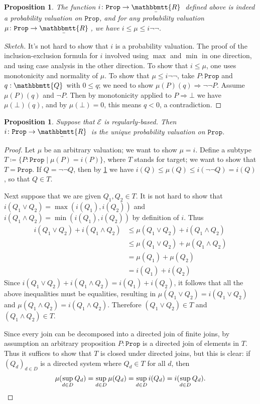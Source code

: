 \documentclass[11pt, oneside, article]{memoir}
\theoremstyle{plain}
\newtheorem{proposition}[theorem]{Proposition}
\theoremstyle{definition}
\theoremstyle{remark}
\newcommand{\const}[1]{\mathtt{#1}}
\newcommand{\cat}[1]{\mathcal{#1}}
\newcommand{\ubar}[1]{\underaccent{\bar}{#1}}
\newcommand{\internal}[1]{\raisebox{-.03ex}{$\mathbbmtt{#1}$}}
\newcommand{\hs}{\hspace{1.1pt}}
\newcommand{\tQQ}{\internal{Q}\hs}
\newcommand{\tRR}{\internal{R}\hs}
\newcommand{\tLR}{\ubar{\tRR}\hs}
\newcommand{\Prop}{\const{Prop}}
\newcommand{\imp}{\Rightarrow}
\begin{document}
\begin{proposition}\label{prop.sandwich}
The function $i\colon\Prop\to\tLR$ defined above is indeed a probability valuation on $\Prop$, and for any probability valuation $\mu\colon\Prop\to\tLR$, we have $i\leq\mu\leq i\neg\neg$.
\end{proposition}
\begin{proof}[Sketch]
It's not hard to show that $i$ is a probability valuation. The proof of the inclusion-exclusion formula for $i$ involved using $\max$ and $\min$ in one direction, and using case analysis in the other direction. To show that $i\leq\mu$, one uses monotonicity and normality of $\mu$. To show that $\mu\leq i\neg\neg$, take $P:\Prop$ and $q:\tQQ$ with $0\leq q$; we need to show $\mu(P)(q)\imp\neg\neg P$. Assume $\mu(P)(q)$ and $\neg P$. Then by monotonicity applied to $P \imp \bot$ we have $\mu(\bot)(q)$, and by $\mu(\bot)=0$, this means $q<0$, a contradiction.
\end{proof}

\begin{proposition}\label{prop.unique_probability_valuation_on_prop}
Suppose that $\cat{E}$ is regularly-based. Then $i\colon\Prop\to\tLR$ is the unique probability valuation on $\Prop$. 
\end{proposition}
\begin{proof}
Let $\mu$ be an arbitrary valuation; we want to show $\mu=i$. Define a subtype $T\coloneqq\{P:\Prop\mid\mu(P)=i(P)\}$, where $T$ stands for target; we want to show that $T=\Prop$. If $Q = \neg\neg Q$, then by \cref{prop.sandwich} we have $i(Q)\leq\mu(Q)\leq i(\neg\neg Q)=i(Q)$, so that $Q\in T$.

Next suppose that we are given $Q_1,Q_2\in T$. It is not hard to show that $i(Q_1\vee Q_2)=\max(i(Q_1),i(Q_2))$ and $i(Q_1\wedge Q_2)=\min(i(Q_1),i(Q_2))$ by definition of $i$. Thus
\begin{align*}
	i(Q_1\vee Q_2)+i(Q_1\wedge Q_2)
	&\leq\mu(Q_1\vee Q_2)+i(Q_1\wedge Q_2)\\
	&\leq \mu(Q_1\vee Q_2)+\mu(Q_1\wedge Q_2)\\
	&=\mu(Q_1)+\mu(Q_2)\\
	&=i(Q_1)+i(Q_2)
\end{align*}
Since $i(Q_1\vee Q_2)+i(Q_1\wedge Q_2)=i(Q_1)+i(Q_2)$, it follows that all the above inequalities must be equalities, resulting in $\mu(Q_1\vee Q_2)=i(Q_1\vee Q_2)$ and $\mu(Q_1\wedge Q_2) = i(Q_1\wedge Q_2)$. Therefore $(Q_1 \vee Q_2) \in T$ and $(Q_1\wedge Q_2)\in T$.

Since every join can be decomposed into a directed join of finite joins, by assumption an arbitrary proposition $P:\Prop$ is a directed join of elements in $T$. Thus it suffices to show that $T$ is closed under directed joins, but this is clear: if $(Q_d)_{d\in D}$ is a directed system where $Q_d\in T$ for all $d$, then
\[\mu(\sup_{d\in D}Q_d)=\sup_{d\in D}\mu(Q_d)=\sup_{d\in D} i(Q_d)=i(\sup_{d\in D}Q_d).\qedhere\]
\end{proof}
\end{document}
